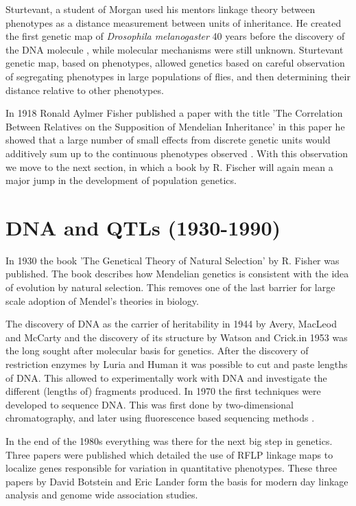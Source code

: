 Sturtevant, a student of Morgan used his mentors linkage theory between phenotypes 
as a distance measurement between units of inheritance. He created the first genetic 
map of \emph{Drosophila melanogaster} 40 years before the discovery of the DNA molecule \cite{Morgan:1915}, 
while molecular mechanisms were still unknown. Sturtevant genetic map, based on 
phenotypes, allowed genetics based on careful observation of segregating phenotypes in 
large populations of flies, and then determining their distance relative to other 
phenotypes.

In 1918 Ronald Aylmer Fisher published a paper with the title 'The Correlation Between 
Relatives on the Supposition of Mendelian Inheritance' in this paper he showed that a 
large number of small effects from discrete genetic units would additively sum up to 
the continuous phenotypes observed \cite{Fisher:1918}. With this observation we move 
to the next section, in which a book by R. Fischer will again mean a major jump in 
the development of population genetics.

\section{DNA and QTLs (1930-1990)}
In 1930 the book 'The Genetical Theory of Natural Selection' \cite{Fisher:1930} by R. 
Fisher was published. The book describes how Mendelian genetics is consistent with the 
idea of evolution by natural selection. This removes one of the last barrier for large 
scale adoption of Mendel's theories in biology.

The discovery of DNA as the carrier of heritability in 1944 by Avery, MacLeod and McCarty 
\cite{Avery:1944} and the discovery of its structure by Watson and Crick.in 1953 
\cite{Watson:1953} was the long sought after molecular basis for genetics. After the 
discovery of restriction enzymes by Luria and Human \cite{Luria:1952} it was possible 
to cut and paste lengths of DNA. This allowed to experimentally work with DNA and 
investigate the different (lengths of) fragments produced. In 1970 the first techniques 
were developed to sequence DNA. This was first done by two-dimensional chromatography, 
and later using fluorescence based sequencing methods \cite{Pettersson:2009}.

In the end of the 1980s everything was there for the next big step in genetics. Three 
papers were published which detailed the use of RFLP linkage maps to localize genes 
responsible for variation in quantitative phenotypes. These three papers by David Botstein 
and Eric Lander \cite{Lander:1986, Lander:1987, Lander:1989} form the basis for modern 
day linkage analysis and genome wide association studies. 


